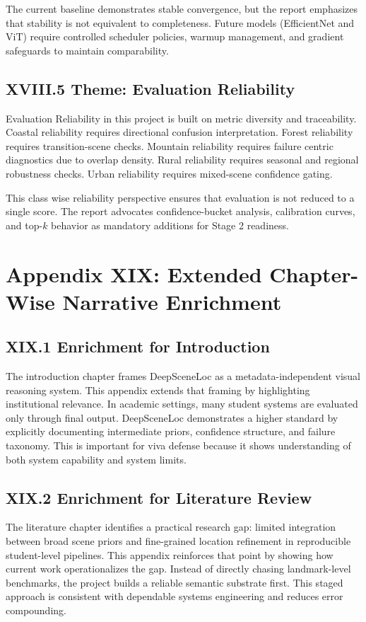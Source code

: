 The current baseline demonstrates stable convergence, but the report emphasizes that stability is not equivalent to completeness. Future models (EfficientNet and ViT) require controlled scheduler policies, warmup management, and gradient safeguards to maintain comparability.

\subsection*{XVIII.5 Theme: Evaluation Reliability}
Evaluation Reliability in this project is built on metric diversity and traceability. Coastal reliability requires directional confusion interpretation. Forest reliability requires transition-scene checks. Mountain reliability requires failure centric diagnostics due to overlap density. Rural reliability requires seasonal and regional robustness checks. Urban reliability requires mixed-scene confidence gating.

This class wise reliability perspective ensures that evaluation is not reduced to a single score. The report advocates confidence-bucket analysis, calibration curves, and top-$k$ behavior as mandatory additions for Stage 2 readiness.

\section*{Appendix XIX: Extended Chapter-Wise Narrative Enrichment}

\subsection*{XIX.1 Enrichment for Introduction}
The introduction chapter frames DeepSceneLoc as a metadata-independent visual reasoning system. This appendix extends that framing by highlighting institutional relevance. In academic settings, many student systems are evaluated only through final output. DeepSceneLoc demonstrates a higher standard by explicitly documenting intermediate priors, confidence structure, and failure taxonomy. This is important for viva defense because it shows understanding of both system capability and system limits.

\subsection*{XIX.2 Enrichment for Literature Review}
The literature chapter identifies a practical research gap: limited integration between broad scene priors and fine-grained location refinement in reproducible student-level pipelines. This appendix reinforces that point by showing how current work operationalizes the gap. Instead of directly chasing landmark-level benchmarks, the project builds a reliable semantic substrate first. This staged approach is consistent with dependable systems engineering and reduces error compounding.

